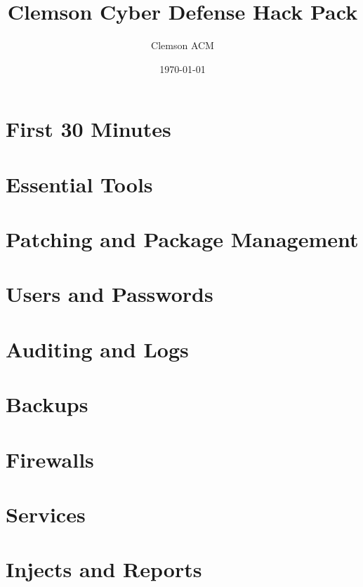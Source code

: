 \documentclass[letterpaper, 10pt]{report}
\title{Clemson Cyber Defense Hack Pack}
\author{Clemson ACM}
\date{\today}
\begin{document}
\maketitle





\tableofcontents

\chapter{First 30 Minutes}


\chapter{Essential Tools}






\chapter{Patching and Package Management}

\chapter{Users and Passwords}





\chapter{Auditing and Logs}

\chapter{Backups}

\chapter{Firewalls}



\chapter{Services}





\chapter{Injects and Reports}




\printindex


\end{document}
